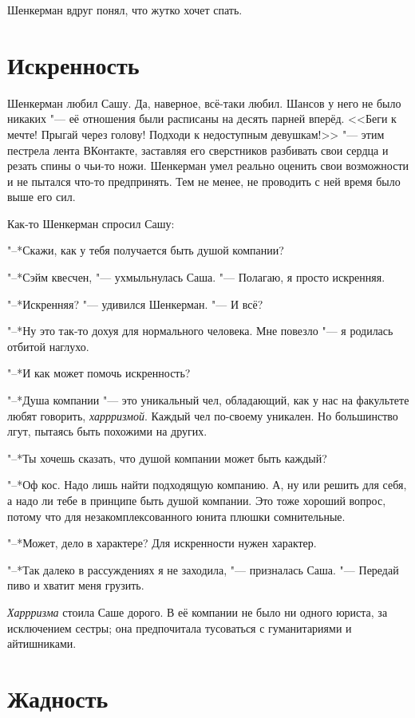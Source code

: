 Шенкерман вдруг понял, что жутко хочет спать.

\section{Искренность}

Шенкерман любил Сашу.
Да, наверное, всё-таки любил.
Шансов у него не было никаких "--- её отношения были расписаны на десять парней вперёд.
<<Беги к мечте!
Прыгай через голову!
Подходи к недоступным девушкам!>> "--- этим пестрела лента ВКонтакте, заставляя его сверстников разбивать свои сердца и резать спины о чьи-то ножи.
Шенкерман умел реально оценить свои возможности и не пытался что-то предпринять.
Тем не менее, не проводить с ней время было выше его сил.

Как-то Шенкерман спросил Сашу:

"--*Скажи, как у тебя получается быть душой компании?

"--*Сэйм квесчен, "--- ухмыльнулась Саша.
"--- Полагаю, я просто искренняя.

"--*Искренняя? "--- удивился Шенкерман.
"--- И всё?

"--*Ну это так-то дохуя для нормального человека.
Мне повезло "--- я родилась отбитой наглухо.

"--*И как может помочь искренность?

"--*Душа компании "--- это уникальный чел, обладающий, как у нас на факультете любят говорить, \emph{харрризмой}.
Каждый чел по-своему уникален.
Но большинство лгут, пытаясь быть похожими на других.

"--*Ты хочешь сказать, что душой компании может быть каждый?

"--*Оф кос.
Надо лишь найти подходящую компанию.
А, ну или решить для себя, а надо ли тебе в принципе быть душой компании.
Это тоже хороший вопрос, потому что для незакомплексованного юнита плюшки сомнительные.

"--*Может, дело в характере?
Для искренности нужен характер.

"--*Так далеко в рассуждениях я не заходила, "--- призналась Саша.
"--- Передай пиво и хватит меня грузить.

\emph{Харрризма} стоила Саше дорого.
В её компании не было ни одного юриста, за исключением сестры;
она предпочитала тусоваться с гуманитариями и айтишниками.

\section{Жадность}


